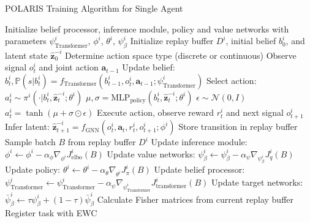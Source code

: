 \begin{algorithm}[!htbp]
\caption{POLARIS Training Algorithm for Single Agent}
\begin{algorithmic}[1]
\State Initialize belief processor, inference module, policy and value networks with parameters $\psi^i_{\text{Transformer}}$, $\phi^i$, $\theta^i$, $\psi^i_{\beta}$
\State Initialize replay buffer $D^i$, initial belief $b^i_0$, and latent state $\boldsymbol{\hat{z}}^{-i}_0$
\State Determine action space type (discrete or continuous)
    \State Observe signal $o^i_t$ and joint action $\boldsymbol{a}_{t-1}$
    \State Update belief: $b^i_t, \mathbb{P}(s|b^i_t) = f_{\text{Transformer}}(b^i_{t-1}, o^i_t, \boldsymbol{a}_{t-1}; \psi^i_{\text{Transformer}})$
    \State Select action: 
        \State $a^i_t \sim \pi^i(\cdot|b^i_t, \boldsymbol{\hat{z}}^{-i}_t; \theta^i)$ 
    \Else
        \State $\mu, \sigma = \text{MLP}_{\text{policy}}(b^i_t, \boldsymbol{\hat{z}}^{-i}_t; \theta^i)$
        \State $\epsilon \sim \mathcal{N}(0, I)$
        \State $a^i_t = \tanh(\mu + \sigma \odot \epsilon)$ 
    \EndIf
    \State Execute action, observe reward $r^i_t$ and next signal $o^i_{t+1}$
    \State Infer latent: $\boldsymbol{\hat{z}}^{-i}_{t+1} = f_{\text{GNN}}(o^i_t, \boldsymbol{a}_t, r^i_t, o^i_{t+1}; \phi^i)$
    \State Store transition in replay buffer
        \State Sample batch $B$ from replay buffer $D^i$
        \State Update inference module: $\phi^i \leftarrow \phi^i - \alpha_{\phi} \nabla_{\phi^i} J^i_{\text{elbo}}(B)$
        \State Update value networks: $\psi^i_{\beta} \leftarrow \psi^i_{\beta} - \alpha_{\psi} \nabla_{\psi^i_{\beta}} J^i_{q}(B)$
        \State Update policy: $\theta^i \leftarrow \theta^i - \alpha_{\theta} \nabla_{\theta^i} J^i_{\pi}(B)$ 
        \State Update belief processor: $\psi^i_{\text{Transformer}} \leftarrow \psi^i_{\text{Transformer}} - \alpha_{\psi} \nabla_{\psi^i_{\text{Transformer}}} J^i_{\text{transformer}}(B)$
        \State Update target networks: $\bar{\psi}^i_{\beta} \leftarrow \tau \psi^i_{\beta} + (1-\tau) \bar{\psi}^i_{\beta}$
            \State Calculate Fisher matrices from current replay buffer
            \State Register task with EWC
        \EndIf
    \EndIf
\EndFor
\end{algorithmic}
\end{algorithm}

